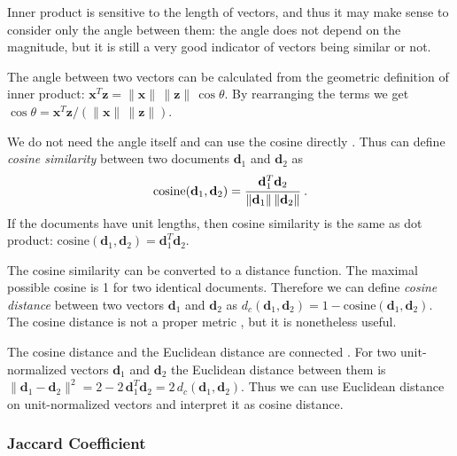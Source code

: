 

Inner product is sensitive to the length of vectors, and thus
it may make sense to consider only the angle between them:
the angle does not depend on the magnitude, but it is still
a very good indicator of vectors being similar or not.

The angle between two vectors can be calculated from the geometric
definition of inner product:
$\mathbf x^T \mathbf z = \|\mathbf x \| \, \| \mathbf z \| \, \cos \theta$.
By rearranging the terms we get
$\cos \theta = \mathbf x^T \mathbf z / (\|\mathbf x \| \, \| \mathbf z \|)$.

We do not need the angle itself and can use the cosine directly
\cite{manning2008introduction}.
Thus can define \emph{cosine similarity} between two documents $\mathbf d_1$ and
$\mathbf d_2$ as
$$\text{cosine}(\mathbf d_1, \mathbf d_2) = \cfrac{\mathbf d_1^T \mathbf d_2}{\|\mathbf d_1 \| \, \| \mathbf d_2 \|} \ .$$
If the documents have unit lengths, then cosine similarity is the same as
dot product: $\text{cosine}(\mathbf d_1, \mathbf d_2) = \mathbf d_1^T \mathbf d_2$.

The cosine similarity can be converted to a distance function.
The maximal possible cosine is 1 for two identical documents. 
Therefore we can define \emph{cosine distance} between two vectors 
$\mathbf d_1$ and $\mathbf d_2$ as 
$d_c(\mathbf d_1, \mathbf d_2) = 1 - \text{cosine}(\mathbf d_1, \mathbf d_2)$.
The cosine distance is not a proper metric \cite{korenius2007principal},
but it is nonetheless useful.

The cosine distance and the Euclidean distance are connected \cite{korenius2007principal}.
For two unit-normalized vectors $\mathbf d_1$ and $\mathbf d_2$ the Euclidean distance 
between them is $\| \mathbf d_1 - \mathbf d_2 \|^2 = 2 - 2 \, \mathbf d_1^T \mathbf d_2 =2 \, d_c(\mathbf d_1, \mathbf d_2)$. Thus we can use Euclidean distance on 
unit-normalized vectors and interpret it as cosine distance.


\subsubsection{Jaccard Coefficient} \ \\

